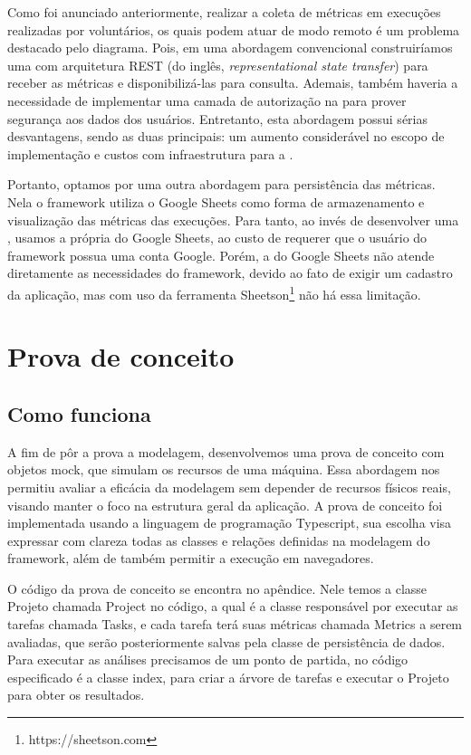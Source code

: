 \documentclass[12pt]{tcc}
\begin{document}
Como foi anunciado anteriormente, realizar a coleta de métricas em execuções realizadas por voluntários, os quais podem atuar de modo remoto é um problema destacado pelo diagrama.
Pois, em uma abordagem convencional construiríamos uma  com arquitetura REST (do inglês, \emph{representational state transfer}) para receber as métricas e disponibilizá-las para consulta.
Ademais, também haveria a necessidade de implementar uma camada de autorização na  para prover segurança aos dados dos usuários.
Entretanto, esta abordagem possui sérias desvantagens, sendo as duas principais: um aumento considerável no escopo de implementação e custos com infraestrutura para a .

Portanto, optamos por uma outra abordagem para persistência das métricas.
Nela o framework utiliza o Google Sheets como forma de armazenamento e visualização das métricas das execuções.
Para tanto, ao invés de desenvolver uma , usamos a própria  do Google Sheets, ao custo de requerer que o usuário do framework possua uma conta Google.
Porém, a  do Google Sheets não atende diretamente as necessidades do framework, devido ao fato de exigir um cadastro da aplicação, mas com uso da ferramenta Sheetson\footnote{https://sheetson.com} não há essa limitação.


\chapter{Prova de conceito}
\label{cap:prova_de_conceito}
\section{Como funciona}
A fim de pôr a prova a modelagem, desenvolvemos uma prova de conceito com objetos mock, que simulam os recursos de uma máquina. Essa abordagem nos permitiu avaliar a eficácia da modelagem sem depender de recursos físicos reais, visando manter o foco na estrutura geral da aplicação. A prova de conceito foi implementada usando a linguagem de programação Typescript, sua escolha visa expressar com clareza todas as classes e relações definidas na modelagem do framework, além de também permitir a execução em navegadores.

O código da prova de conceito se encontra no apêndice. Nele temos a classe Projeto chamada Project no código, a qual é a classe responsável por executar as tarefas chamada Tasks, e cada tarefa terá suas métricas chamada Metrics a serem avaliadas, que serão posteriormente salvas pela classe de persistência de dados. Para executar as análises precisamos de um ponto de partida, no código especificado é a classe index, para criar a árvore de tarefas e executar o Projeto para obter os resultados.
\end{document}
